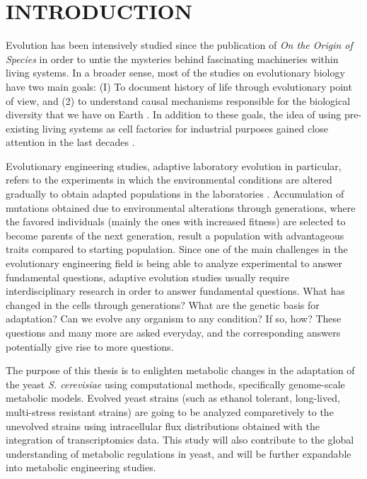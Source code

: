 \chapter{INTRODUCTION}
Evolution has been intensively studied since the publication of \emph{On the Origin of Species} in order to untie the mysteries behind fascinating machineries within living systems. In a broader sense, most of the studies on evolutionary biology have two main goals: (I) To document history of life through evolutionary point of view, and (2) to understand causal mechanisms responsible for the biological diversity that we have on Earth \cite{futuyma2001evolution, hird2017evolutionary}. In addition to these goals, the idea of using pre-existing living systems as cell factories for industrial purposes gained close attention in the last decades \cite{nielsen2016engineering}.

Evolutionary engineering studies, adaptive laboratory evolution in particular, refers to the experiments in which the environmental conditions are altered gradually to obtain adapted populations in the laboratories \cite{garland2009experimental}. Accumulation of mutations obtained due to environmental alterations through generations, where the favored individuals (mainly the ones with increased fitness) are selected to become parents of the next generation, result a population with advantageous traits compared to starting population. Since one of the main challenges in the evolutionary engineering field is being able to analyze experimental to answer fundamental questions, adaptive evolution studies usually require interdisciplinary research in order to answer fundamental questions. What has changed in the cells through generations? What are the genetic basis for adaptation? Can we evolve any organism to any condition? If so, how? These questions and many more are asked everyday, and the corresponding answers potentially give rise to more questions.

The purpose of this thesis is to enlighten metabolic changes in the adaptation of the yeast \emph{S. cerevisiae} using computational methods, specifically genome-scale metabolic models. Evolved yeast strains (such as ethanol tolerant, long-lived, multi-stress resistant strains) are going to be analyzed comparetively to the unevolved strains using intracellular flux distributions obtained with the integration of transcriptomics data. This study will also contribute to the global understanding of metabolic regulations in yeast, and will be further expandable into metabolic engineering studies.

